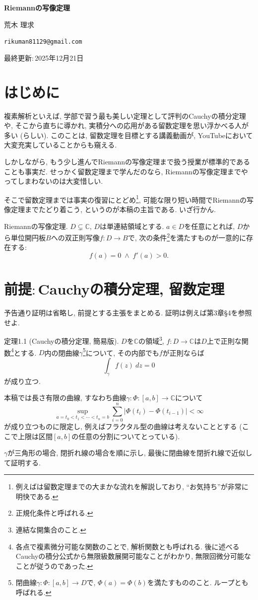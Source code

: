 \documentclass{jsarticle}
\newcommand{\C}{\mathbb{C}}%
\begin{document}
\begin{center}
{\large \textbf{Riemannの写像定理}}\par
\vspace{0.5em}
荒木 理求\par
\texttt{rikuman81129@gmail.com}\par
最終更新$\colon$2025年12月21日
\end{center}
\setcounter{section}{-1}
\section{はじめに}
複素解析といえば, 学部で習う最も美しい定理として評判のCauchyの積分定理や, そこから直ちに導かれ, 実積分への応用がある留数定理を思い浮かべる人が多い (らしい). このことは, 留数定理を目標とする講義動画が, YouTubeにおいて大変充実していることからも窺える.

しかしながら, もう少し進んでRiemannの写像定理まで扱う授業が標準的であることも事実だ. せっかく留数定理まで学んだのなら, Riemannの写像定理までやってしまわないのは大変惜しい. 

そこで留数定理までは事実の復習にとどめ\footnote{例えば\cite{Yamamoto1}は留数定理までの大まかな流れを解説しており, ``お気持ち''が非常に明快である.}, 可能な限り短い時間でRiemannの写像定理までたどり着こう, というのが本稿の主旨である. いざ行かん.　 

\begin{thm}{Riemannの写像定理.}
$D\subsetneq\C$, $D$は単連結領域とする. $a\in D$を任意にとれば, $D$から単位開円板$B$への双正則写像$f\colon D\to B$で, 次の条件\footnote{正規化条件と呼ばれる.}を満たすものが一意的に存在する$\colon$
\[
f(a)=0\;\land\;f'(a)>0.
\]
\end{thm}
\section{前提$\colon$Cauchyの積分定理, 留数定理}
予告通り証明は省略し, 前提とする主張をまとめる. 証明は例えば\cite{Noguchi}第3章\S 4を参照せよ. 
\begin{thm}{定理1.1 (Cauchyの積分定理, 簡易版).}
$D$を$\C$の領域\footnote{連結な開集合のこと.}, $f\colon D\to \C$は$D$上で正則な関数\footnote{各点で複素微分可能な関数のことで, 解析関数とも呼ばれる. 後に述べるCauchyの積分公式から無限級数展開可能なことがわかり, 無限回微分可能なことが従うのであった.}とする. $D$内の閉曲線$\gamma$\footnote{閉曲線$\gamma\colon\Phi\colon [a, b] \to D$で, $\Phi(a) = \Phi(b)$を満たすもののこと. ループとも呼ばれる.}について, その内部でも$f$が正則ならば
\[
\int_{\gamma}f(z)\:dz=0
\]
が成り立つ.
\end{thm}
\begin{marker}
本稿では長さ有限の曲線, すなわち曲線$\gamma\colon\Phi\colon[a, b]\to\C$について
\[
\sup_{a=t_0<t_1<\cdots<t_n=b}\sum_{i=0}^{n}|\Phi(t_i)-\Phi(t_{i-1})|<\infty
\]
が成り立つものに限定し, 例えばフラクタル型の曲線は考えないこととする (ここで上限は区間$[a, b]$の任意の分割についてとっている).
\end{marker}
$\gamma$が三角形の場合, 閉折れ線の場合を順に示し, 最後に閉曲線を閉折れ線で近似して証明する.
\end{document}

